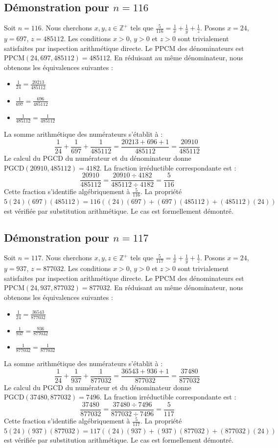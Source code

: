 \documentclass[12pt,a4paper]{article}
\begin{document}
\subsection{Démonstration pour $n = 116$}
Soit $n = 116$. Nous cherchons $x, y, z \in \mathbb{Z}^{+}$ tels que $\frac{5}{116} = \frac{1}{x} + \frac{1}{y} + \frac{1}{z}$.
Posons $x = 24$, $y = 697$, $z = 485112$.
Les conditions $x > 0$, $y > 0$ et $z > 0$ sont trivialement satisfaites par inspection arithmétique directe.
Le PPCM des dénominateurs est $\text{PPCM}(24, 697, 485112) = 485112$.
En réduisant au même dénominateur, nous obtenons les équivalences suivantes :
\begin{itemize}
    \item $\frac{1}{24} = \frac{20213}{485112}$
    \item $\frac{1}{697} = \frac{696}{485112}$
    \item $\frac{1}{485112} = \frac{1}{485112}$
\end{itemize}
La somme arithmétique des numérateurs s'établit à :
$$ \frac{1}{24} + \frac{1}{697} + \frac{1}{485112} = \frac{20213 + 696 + 1}{485112} = \frac{20910}{485112} $$
Le calcul du PGCD du numérateur et du dénominateur donne $\text{PGCD}(20910, 485112) = 4182$.
La fraction irréductible correspondante est :
$$ \frac{20910}{485112} = \frac{20910 \div 4182}{485112 \div 4182} = \frac{5}{116} $$
Cette fraction s'identifie algébriquement à $\frac{5}{116}$.
La propriété $5(24)(697)(485112) = 116((24)(697) + (697)(485112) + (485112)(24))$ est vérifiée par substitution arithmétique.
Le cas est formellement démontré.

\subsection{Démonstration pour $n = 117$}
Soit $n = 117$. Nous cherchons $x, y, z \in \mathbb{Z}^{+}$ tels que $\frac{5}{117} = \frac{1}{x} + \frac{1}{y} + \frac{1}{z}$.
Posons $x = 24$, $y = 937$, $z = 877032$.
Les conditions $x > 0$, $y > 0$ et $z > 0$ sont trivialement satisfaites par inspection arithmétique directe.
Le PPCM des dénominateurs est $\text{PPCM}(24, 937, 877032) = 877032$.
En réduisant au même dénominateur, nous obtenons les équivalences suivantes :
\begin{itemize}
    \item $\frac{1}{24} = \frac{36543}{877032}$
    \item $\frac{1}{937} = \frac{936}{877032}$
    \item $\frac{1}{877032} = \frac{1}{877032}$
\end{itemize}
La somme arithmétique des numérateurs s'établit à :
$$ \frac{1}{24} + \frac{1}{937} + \frac{1}{877032} = \frac{36543 + 936 + 1}{877032} = \frac{37480}{877032} $$
Le calcul du PGCD du numérateur et du dénominateur donne $\text{PGCD}(37480, 877032) = 7496$.
La fraction irréductible correspondante est :
$$ \frac{37480}{877032} = \frac{37480 \div 7496}{877032 \div 7496} = \frac{5}{117} $$
Cette fraction s'identifie algébriquement à $\frac{5}{117}$.
La propriété $5(24)(937)(877032) = 117((24)(937) + (937)(877032) + (877032)(24))$ est vérifiée par substitution arithmétique.
Le cas est formellement démontré.
\end{document}
